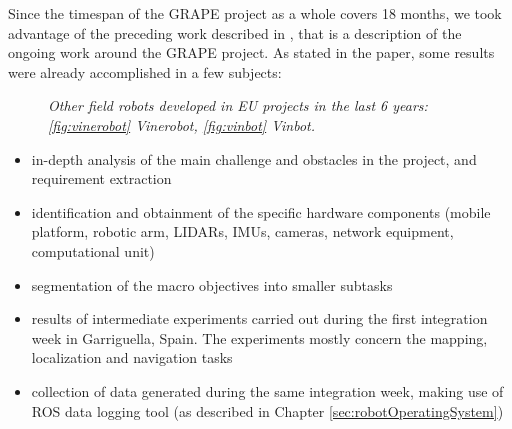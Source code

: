  Since the timespan of the \ac{GRAPE} project as a whole covers 18 months, we took advantage of the preceding work described in \cite{grapeAltroPaper}, that is a description of the ongoing work around the \ac{GRAPE} project. As stated in the paper, some results were already accomplished in a few subjects:

\begin{figure}
	\centering
	\qquad
	\caption{\textit{Other field robots developed in EU projects in the last 6 years: \ref{fig:vinerobot} Vinerobot, \ref{fig:vinbot} Vinbot.}}
\end{figure}

\begin{itemize}
	\item in-depth analysis of the main challenge and obstacles in the project, and requirement extraction
	\item identification and obtainment of the specific hardware components (mobile platform, robotic arm, \ac{LIDAR}s, \ac{IMU}s, cameras, network equipment, computational unit)
	\item segmentation of the macro objectives into smaller subtasks
	\item results of intermediate experiments carried out during the first integration week in Garriguella, Spain. The experiments mostly concern the mapping, localization and navigation tasks
	\item collection of data generated during the same integration week, making use of \ac{ROS} data logging tool (as described in Chapter \ref{sec:robotOperatingSystem})
\end{itemize}

